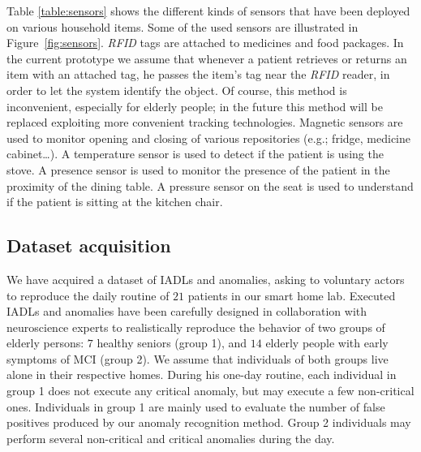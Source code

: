\documentclass[10pt, conference, compsocconf]{IEEEtran}
\begin{document}
\begin{figure*}[t!]
\centering
{}
\caption{Some sensors used in the smart home lab.\label{fig:sensors}}
\end{figure*}

Table \ref{table:sensors} shows the different kinds of sensors that have been deployed on various household items. Some of the used sensors are illustrated in Figure~\ref{fig:sensors}. 
\emph{RFID} tags are attached to medicines and food packages. In the current prototype we assume that whenever a patient retrieves or returns an item with an attached tag, he passes the item's tag near the \emph{RFID} reader, in order to let the system identify the object. Of course, this method is inconvenient, especially for elderly people; in the future this method will be replaced exploiting more convenient tracking technologies. 
Magnetic sensors are used to monitor opening and closing of various repositories (e.g.; fridge, medicine cabinet\dots). A temperature sensor is used to detect if the patient is using the stove. A presence sensor is used to monitor the presence of the patient in the proximity of the dining table. A pressure sensor on the seat is used to understand if the patient is sitting at the kitchen chair.




 

\subsection{Dataset acquisition}
We have acquired a dataset of IADLs and anomalies, asking to voluntary actors to reproduce the daily routine of $21$ patients in our smart home lab. Executed IADLs and anomalies have been carefully designed in collaboration with neuroscience experts to realistically reproduce the behavior of two groups of elderly persons: $7$ healthy seniors (group 1), and $14$ elderly people with early symptoms of MCI (group 2). We assume that individuals of both groups live alone in their respective homes. During his one-day routine, each individual in group 1 does not execute any critical anomaly, but may execute a few non-critical ones. Individuals in group 1 are mainly used to evaluate the number of false positives produced by our anomaly recognition method. Group 2 individuals may perform several non-critical and critical anomalies during the day. 
\end{document}
